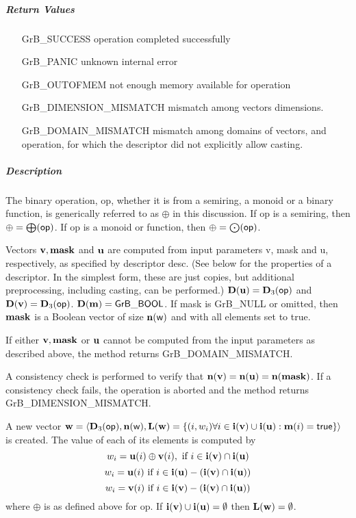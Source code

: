 \subparagraph{Return Values}

\begin{itemize}[leftmargin=2.1in]
\item[{\sf GrB\_SUCCESS}]             operation completed successfully
\item[{\sf GrB\_PANIC}]               unknown internal error
\item[{\sf GrB\_OUTOFMEM}]            not enough memory available for operation
\item[{\sf GrB\_DIMENSION\_MISMATCH}] mismatch among vectors dimensions.
\item[{\sf GrB\_DOMAIN\_MISMATCH}]    mismatch among domains of vectors, and operation, for which the descriptor did not explicitly allow casting.
\end{itemize}

\subparagraph{Description}

The binary operation, {\sf op}, whether it is from a semiring, a monoid or a binary function,
is generically referred to as $\oplus$ in this discussion.
If {\sf op} is a semiring, then $\oplus = \bigoplus({\sf op})$. 
If {\sf op} is a monoid or function, then $\oplus = \bigodot({\sf op})$.

Vectors ${\bf v}, {\bf mask}$ and ${\bf u}$ are computed from
input parameters {\sf v}, {\sf mask} and {\sf u}, respectively, as specified
by descriptor {\sf desc}. (See below for the properties of a descriptor. In
the simplest form, these are just copies, but additional preprocessing,
including casting, can be performed.)  $\bold{D}({\bf u}) =
\bold{D}_3({\sf op})$ and $\bold{D}({\bf v}) = \bold{D}_3({\sf op})$.
$\bold{D}({\bf m}) = {\sf GrB\_BOOL}$.  If {\sf mask} is {\sf GrB\_NULL} or omitted,
then ${\bf mask}$ is a Boolean vector of size $\bold{n}({\bf \sf w})$
and with all elements set to {\sf true}.

If either ${\bf v}, {\bf mask}$ or ${\bf u}$ cannot be computed
from the input parameters as described above, the method returns {\sf
GrB\_DOMAIN\_MISMATCH}.

A consistency check is performed to verify that $\bold{n}({\bf v})
= \bold{n}({\bf u}) = \bold{n}({\bf mask})$. If a consistency check fails, the operation is
aborted and the method returns {\sf GrB\_DIMENSION\_MISMATCH}.

A new vector ${\bf w} = \langle \bold{D}_3({\sf op}),
\bold{n}({\bf \sf w}), \bold{L}({\bf w}) = \{(i,w_i)  \forall i \in
{\bf i}({\bf v}) \cup {\bf i}({\bf u}) : {\bf m}(i)
= {\sf true} \} \rangle$ is created.  The value of each of its
elements is computed by 
\[
w_i = {\bf u}(i) \oplus {\bf v}(i), \ \mbox{if}\  i \in  {\bf i}({\bf v}) \cap {\bf i}({\bf u})
\]
\[
w_i = {\bf u}(i) \ \mbox{if}\  i \in  {\bf i}({\bf u}) - ({\bf i}({\bf v}) \cap {\bf i}({\bf u}))
\]
\[
w_i = {\bf v}(i) \ \mbox{if}\  i \in  {\bf i}({\bf v}) - ({\bf i}({\bf v}) \cap {\bf i}({\bf u}))
\]
where $\oplus$ is as defined above for {\sf op}.
If ${\bf i}({\bf v}) \cup {\bf i}({\bf u}) = \emptyset$
then $\bold{L}({\bf w}) = \emptyset$.


